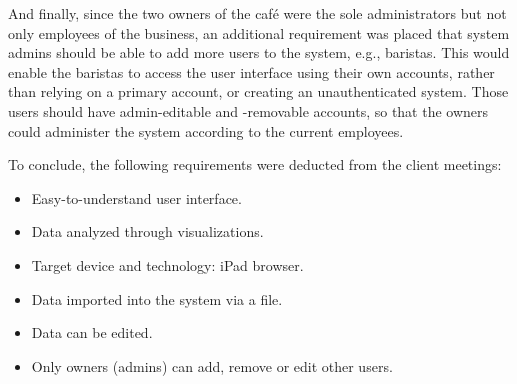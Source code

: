And finally, since the two owners of the café were the sole administrators but not only employees of the business, an
additional requirement was placed that system admins should be able to add more users to the system, e.g., baristas.
This would enable the baristas to access the user interface using their own accounts, rather than relying on a primary
account, or creating an unauthenticated system.
Those users should have admin-editable and -removable accounts, so that the owners could administer the system according
to the current employees.

To conclude, the following requirements were deducted from the client meetings:
\begin{itemize}
    \item Easy-to-understand user interface.

    \item Data analyzed through visualizations.

    \item Target device and technology: iPad browser.

    \item Data imported into the system via a file.

    \item Data can be edited.

    \item Only owners (admins) can add, remove or edit other users.
\end{itemize}
